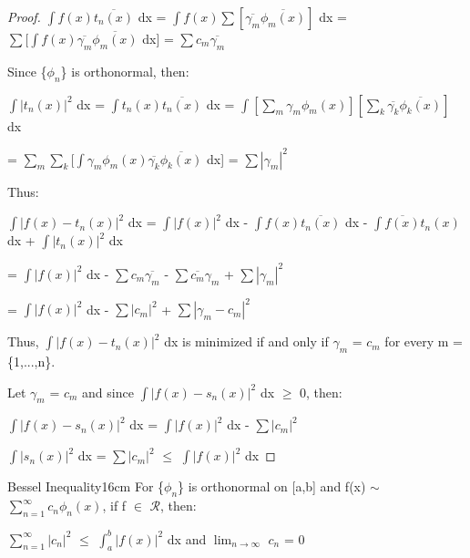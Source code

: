     \begin{proof}
        $\int f(x) \overline{t_n(x)}$ dx
        = $\int f(x) \sum [\overline{\gamma_m} \overline{\phi_m(x)}]$ dx
        = $\sum [\int f(x) \overline{\gamma_m} \overline{\phi_m(x)}$ dx]
        = $\sum c_m \overline{\gamma_m}$

        Since \{$\phi_n$\} is orthonormal, then:

        \hspace{0.5cm}
        $\int |t_n(x)|^2$ dx 
        = $\int t_n(x) \overline{t_n(x)}$ dx
        = $\int [\sum_m \gamma_m\phi_m(x)]
                [\sum_k \overline{\gamma_k}\overline{\phi_k(x)}]$ dx
        
        \hspace{2.9cm}
        = $\sum_m \sum_k [\int \gamma_m\phi_m(x)
                \overline{\gamma_k}\overline{\phi_k(x)}$ dx]
        = $\sum |\gamma_m|^2$

        Thus:

        \hspace{0.1cm}
        $\int |f(x) - t_n(x)|^2$ dx
        = $\int |f(x)|^2$ dx - $\int f(x) \overline{t_n(x)}$ dx
            - $\int \overline{f(x)} t_n(x)$ dx + $\int |t_n(x)|^2$ dx
        
        \hspace{3.7cm}
        = $\int |f(x)|^2$ dx - $\sum c_m \overline{\gamma_m}$
        - $\sum \overline{c_m} \gamma_m$ + $\sum |\gamma_m|^2$

        \hspace{3.7cm}
        = $\int |f(x)|^2$ dx - $\sum |c_m|^2$ + $\sum |\gamma_m - c_m|^2$

        Thus, $\int |f(x) - t_n(x)|^2$ dx
        is minimized if and only if $\gamma_m$ = $c_m$ for every m = \{1,...,n\}.

        Let $\gamma_m$ = $c_m$ and since $\int |f(x) - s_n(x)|^2$ dx $\geq$ 0, then:

        \hspace{0.5cm}
        $\int |f(x) - s_n(x)|^2$ dx = $\int |f(x)|^2$ dx - $\sum |c_m|^2$

        \hspace{0.5cm}
        $\int |s_n(x)|^2$ dx
        = $\sum |c_m|^2$
        $\leq$ $\int |f(x)|^2$ dx
    \end{proof}

    \vspace{0.5cm}



    \begin{wtheorem}{Bessel Inequality}{16cm}
        For \{$\phi_n$\} is orthonormal on [a,b] and
        f(x) $\sim$ $\sum_{n=1}^{\infty} c_n\phi_n(x)$,
        if f $\in$ $\mathscr{R}$, then:

        \hspace{0.5cm}
        $\sum_{n=1}^{\infty} |c_n|^2$ $\leq$ $\int_a^b |f(x)|^2$ dx
        \hspace{1cm}
        and
        \hspace{1cm}
        $\lim_{n \rightarrow \infty}$ $c_n$ = 0
    \end{wtheorem}

